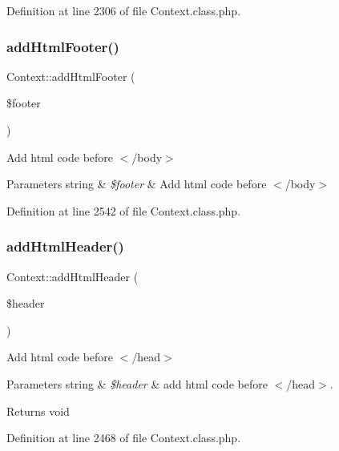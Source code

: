 Definition at line 2306 of file Context.\+class.\+php.

\mbox{\label{classContext_aa81925b1cc7e991c1c798e739fe048a4}} 
\subsubsection{\texorpdfstring{add\+Html\+Footer()}{addHtmlFooter()}}
{\footnotesize\ttfamily Context\+::add\+Html\+Footer (\begin{DoxyParamCaption}\item[{}]{\$footer }\end{DoxyParamCaption})}

Add html code before $<$/body$>$


\begin{DoxyParams}[1]{Parameters}
string & {\em \$footer} & Add html code before $<$/body$>$ \\
\hline
\end{DoxyParams}


Definition at line 2542 of file Context.\+class.\+php.

\mbox{\label{classContext_a26a1aea944ae54bb826500f544a67950}} 
\subsubsection{\texorpdfstring{add\+Html\+Header()}{addHtmlHeader()}}
{\footnotesize\ttfamily Context\+::add\+Html\+Header (\begin{DoxyParamCaption}\item[{}]{\$header }\end{DoxyParamCaption})}

Add html code before $<$/head$>$


\begin{DoxyParams}[1]{Parameters}
string & {\em \$header} & add html code before $<$/head$>$. \\
\hline
\end{DoxyParams}
\begin{DoxyReturn}{Returns}
void 
\end{DoxyReturn}


Definition at line 2468 of file Context.\+class.\+php.

